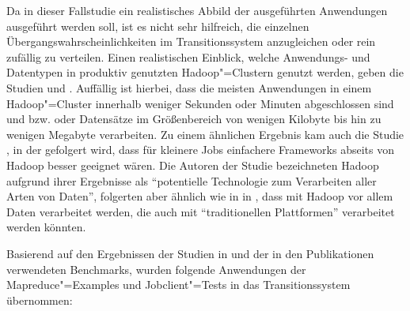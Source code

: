 Da in dieser Fallstudie ein realistisches Abbild der ausgeführten Anwendungen ausgeführt werden soll, ist es nicht sehr hilfreich, die einzelnen Übergangswahrscheinlichkeiten im Transitionssystem anzugleichen oder rein zufällig zu verteilen.
Einen realistischen Einblick, welche Anwendungs- und Datentypen in produktiv genutzten Hadoop"=Clustern genutzt werden, geben \uA die Studien \cite{Chen2012} und \cite{HadoopDataTypes}.
Auffällig ist hierbei, dass die meisten Anwendungen in einem Hadoop"=Cluster innerhalb weniger Sekunden oder Minuten abgeschlossen sind und bzw. oder Datensätze im Größenbereich von wenigen Kilobyte bis hin zu wenigen Megabyte verarbeiten.
Zu einem ähnlichen Ergebnis kam auch die Studie \cite{Ren2013}, in der gefolgert wird, dass für kleinere Jobs einfachere Frameworks abseits von Hadoop besser geeignet wären.
Die Autoren der Studie \cite{HadoopDataTypes} bezeichneten Hadoop aufgrund ihrer Ergebnisse als \enquote{potentielle Technologie zum Verarbeiten aller Arten von Daten}, folgerten aber ähnlich wie in \citeauthor{Ren2013} in \cite{Ren2013}, dass mit Hadoop vor allem Daten verarbeitet werden, die auch mit \enquote{traditionellen Plattformen} verarbeitet werden könnten.

Basierend auf den Ergebnissen der Studien in \cite{Huang2010,Chen2012,HadoopDataTypes,Ren2013} und der in den Publikationen \cite{Shvachko2010,Dean2004,Graves2013} verwendeten Benchmarks, wurden folgende Anwendungen der Mapreduce"=Examples und Jobclient"=Tests in das Transitionssystem übernommen:

